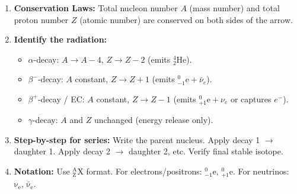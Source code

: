 \documentclass[11pt]{article}
\begin{document}
\begin{methode}
\begin{enumerate}
\item \textbf{Conservation Laws:} Total nucleon number $A$ (mass number) and total proton number $Z$ (atomic number) are conserved on both sides of the arrow.
\item \textbf{Identify the radiation:}
\begin{itemize}
\item $\alpha$-decay: $A \to A-4$, $Z \to Z-2$ (emits $\ensuremath{\mathrm{^{4}_{2}He}}$).
\item $\beta^-$-decay: $A$ constant, $Z \to Z+1$ (emits $\ensuremath{\mathrm{^{0}_{-1}e}} + \bar{\nu}_e$).
\item $\beta^+$-decay / EC: $A$ constant, $Z \to Z-1$ (emits $\ensuremath{\mathrm{^{0}_{+1}e}} + \nu_e$ or captures $e^-$).
\item $\gamma$-decay: $A$ and $Z$ unchanged (energy release only).
\end{itemize}
\item \textbf{Step-by-step for series:} Write the parent nucleus. Apply decay 1 $\to$ daughter 1. Apply decay 2 $\to$ daughter 2, etc. Verify final stable isotope.
\item \textbf{Notation:} Use $\ensuremath{\mathrm{^{A}_{Z}X}}$ format. For electrons/positrons: $\ensuremath{\mathrm{^{0}_{-1}e}}$, $\ensuremath{\mathrm{^{0}_{+1}e}}$. For neutrinos: $\ensuremath{\mathrm{\nu_e}}$, $\ensuremath{\mathrm{\bar{\nu}_e}}$.
\end{enumerate}
\end{methode}
\end{document}
